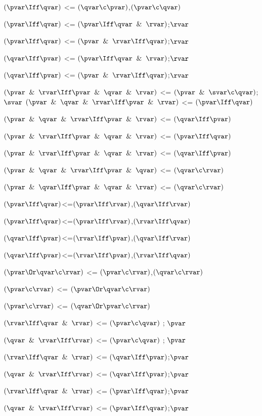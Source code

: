 $(\pvar \Iff \qvar)$ <= $(\qvar \c \pvar)$,$(\pvar \c \qvar)$

$(\pvar \Iff \qvar)$ <= $(\pvar \Iff \qvar \And\rvar)$;$\rvar$

$(\pvar \Iff \qvar)$ <= $(\pvar\And\rvar\Iff \qvar)$;$\rvar$

$(\qvar \Iff \pvar)$ <= $(\pvar \Iff \qvar \And\rvar)$;$\rvar$

$(\qvar \Iff \pvar)$ <= $(\pvar\And\rvar\Iff \qvar)$;$\rvar$

$(\pvar \And \rvar \Iff \pvar \And \qvar \And \rvar)$ <= $(\pvar\And \svar\c \qvar)$; $\svar$
$(\pvar \And \qvar \And \rvar \Iff \pvar \And \rvar)$ <= $(\pvar\Iff\qvar)$

$(\pvar \And \qvar \And \rvar \Iff \pvar \And \rvar)$ <= $(\qvar\Iff\pvar)$

$(\pvar \And \rvar \Iff \pvar \And \qvar \And \rvar)$ <= $(\pvar\Iff\qvar)$

$(\pvar \And \rvar \Iff \pvar \And \qvar \And \rvar)$ <= $(\qvar\Iff\pvar)$

$(\pvar \And \qvar \And \rvar \Iff \pvar \And \qvar)$ <= $(\qvar \c \rvar)$

$(\pvar \And \qvar \Iff \pvar \And \qvar\And \rvar)$ <= $(\qvar \c \rvar)$

$(\pvar \Iff \qvar)$<=$(\pvar \Iff \rvar)$,$(\qvar \Iff \rvar)$

$(\pvar \Iff \qvar)$<=$(\pvar \Iff \rvar)$,$(\rvar \Iff \qvar)$

$(\qvar \Iff \pvar)$<=$(\rvar \Iff \pvar)$,$(\qvar \Iff \rvar)$

$(\qvar \Iff \pvar)$<=$(\rvar \Iff \pvar)$,$(\rvar \Iff \qvar)$


$(\pvar \Or \qvar \c\rvar)$ <= $(\pvar\c\rvar)$,$(\qvar\c\rvar)$

$(\pvar \c \rvar)$ <= $(\pvar \Or \qvar \c \rvar)$

$(\pvar \c \rvar)$ <= $(\qvar \Or \pvar \c \rvar)$

$(\rvar \Iff \qvar \And \rvar)$ <= $(\pvar \c \qvar)$ ; $\pvar$ 

$(\qvar \And \rvar \Iff \rvar)$ <= $(\pvar \c \qvar)$ ; $\pvar$ 

$(\rvar \Iff \qvar \And \rvar)$ <= $(\qvar \Iff \pvar)$;$\pvar$ 

$(\qvar \And \rvar \Iff \rvar)$ <= $(\qvar \Iff \pvar)$;$\pvar$ 

$(\rvar \Iff \qvar \And \rvar)$ <= $(\pvar \Iff \qvar)$;$\pvar$ 

$(\qvar \And \rvar \Iff \rvar)$ <= $(\pvar \Iff \qvar)$;$\pvar$ 

